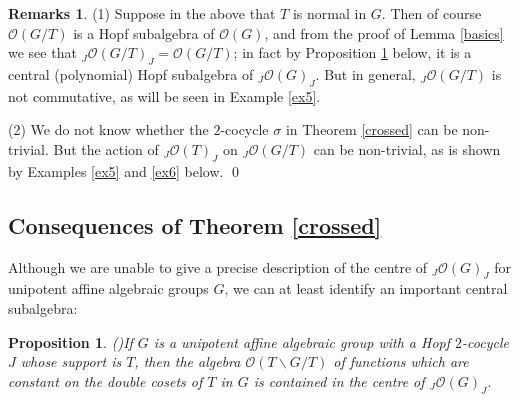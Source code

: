\documentclass{amsart}
\numberwithin{equation}{section}
\newtheorem{proposition}[theorem]{Proposition}
\theoremstyle{definition}
\newtheorem{remarks}[theorem]{Remarks}
\begin{document}
\begin{remarks}
(1) Suppose in the above that $T$ is normal in $G$. Then of course $\mathcal{O}(G/T)$ is a Hopf subalgebra of $\mathcal{O}(G)$, and from the proof of Lemma \ref{basics} we see that ${}_J\mathcal{O}(G/T)_J  = \mathcal{O}(G/T)$; in fact by Proposition \ref{centre} below, it is a central (polynomial) Hopf subalgebra of ${}_J\mathcal{O}(G)_J$. But in general, ${}_J\mathcal{O}(G/T)$ is not commutative, as will be seen in Example \ref{ex5}.

(2) We do not know whether the $2$-cocycle $\sigma$ in Theorem \ref{crossed} can be non-trivial. But the action of ${}_J \mathcal{O}(T)_J$ on ${}_J\mathcal{O}(G/T)$ can be non-trivial, as is shown by Examples \ref{ex5} and \ref{ex6} below. \qed 
\end{remarks}

\subsection{Consequences of Theorem \ref{crossed}}\label{crossedconseq} 
Although we are unable to give a precise description of the centre of ${}_J\mathcal{O}(G)_J$ for unipotent affine algebraic groups $G$, we can at least identify an important central subalgebra:

\begin{proposition}{\rm (\cite[Lemma 3.7]{G2})}\label{centre} 
If $G$ is a unipotent affine algebraic group with a Hopf $2$-cocycle $J$ whose support is $T$, then the algebra $\mathcal{O}(T\backslash G / T)$ of functions which are constant on the double cosets of $T$ in $G$ is contained in the centre of ${}_J\mathcal{O}(G)_J$.
\end{proposition}
\end{document}
